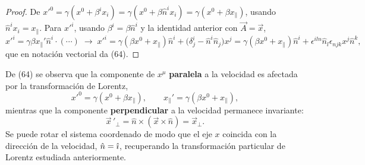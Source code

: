 \begin{proof}
De $x'^0=\gamma(x^0+\beta^ix_i)=\gamma(x^0+\beta\hat n^ix_i)=\gamma(x^0+
\beta x_\parallel)$, usando $\hat n^ix_i=x_\parallel$. Para $x'^i$,
usando $\beta^i=\beta\hat n^i$ y la identidad anterior con $\vec A=\vec
x$,
\[
x'^i = \gamma\beta x_\parallel'\hat n^i \cdot(\cdots) \;\to\;
x'^i = \gamma(\beta x^0+x_\parallel)\hat n^i + \big(\delta^i_j-\hat
n^i\hat n_j\big)x^j = \gamma(\beta x^0+x_\parallel)\hat n^i +
\epsilon^{iln}\hat n_l\epsilon_{njk}x^j\hat n^k,
\]
que en notación vectorial da (64). \qedhere
\end{proof}

\begin{observacion}
De (64) se observa que la componente de $x^\mu$ \textbf{paralela} a la
velocidad es afectada por la transformación de Lorentz,
\[
x'^0 = \gamma(x^0+\beta x_\parallel), \qquad x_\parallel' = \gamma
(\beta x^0+x_\parallel),
\]
mientras que la componente \textbf{perpendicular} a la velocidad
permanece invariante:
\[
\vec x\,'_\perp = \hat n\times(\vec x\times\hat n) = \vec x_\perp .
\]
Se puede rotar el sistema coordenado de modo que el eje $x$ coincida
con la dirección de la velocidad, $\hat n=\hat{\imath}$, recuperando la
transformación particular de Lorentz estudiada anteriormente.
\end{observacion}
